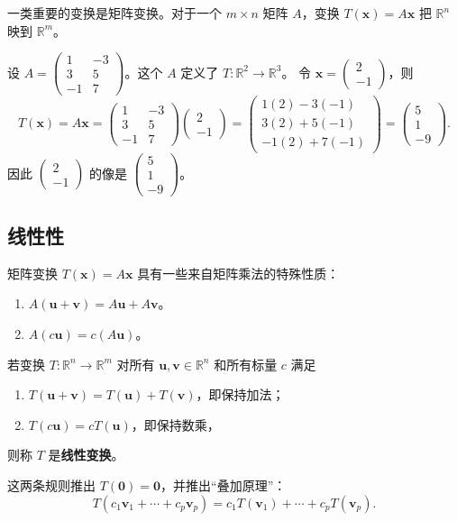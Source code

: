 一类重要的变换是矩阵变换。对于一个 $m\times n$ 矩阵 $A$，变换 $T(\mathbf{x})=A\mathbf{x}$ 把 $\mathbb{R}^n$ 映到 $\mathbb{R}^m$。

\begin{example}
设 $A=\begin{pmatrix}1&-3\\3&5\\-1&7\end{pmatrix}$。这个 $A$ 定义了 $T:\mathbb{R}^2\to\mathbb{R}^3$。
令 $\mathbf{x}=\begin{pmatrix}2\\-1\end{pmatrix}$，则
\[
T(\mathbf{x})=A\mathbf{x}=\begin{pmatrix}1&-3\\3&5\\-1&7\end{pmatrix}\begin{pmatrix}2\\-1\end{pmatrix}
=\begin{pmatrix}1(2)-3(-1)\\3(2)+5(-1)\\-1(2)+7(-1)\end{pmatrix}
=\begin{pmatrix}5\\1\\-9\end{pmatrix}.
\]
因此 $\begin{pmatrix}2\\-1\end{pmatrix}$ 的像是 $\begin{pmatrix}5\\1\\-9\end{pmatrix}$。
\end{example}

\subsection{线性性}
矩阵变换 $T(\mathbf{x})=A\mathbf{x}$ 具有一些来自矩阵乘法的特殊性质：
\begin{enumerate}
    \item $A(\mathbf{u}+\mathbf{v})=A\mathbf{u}+A\mathbf{v}$。
    \item $A(c\mathbf{u})=c(A\mathbf{u})$。
\end{enumerate}

\begin{definition}
若变换 $T:\mathbb{R}^n\to\mathbb{R}^m$ 对所有 $\mathbf{u},\mathbf{v}\in\mathbb{R}^n$ 和所有标量 $c$ 满足
\begin{enumerate}
    \item $T(\mathbf{u}+\mathbf{v})=T(\mathbf{u})+T(\mathbf{v})$，即保持加法；
    \item $T(c\mathbf{u})=cT(\mathbf{u})$，即保持数乘，
\end{enumerate}
则称 $T$ 是\textbf{线性变换}。
\end{definition}
这两条规则推出 $T(\mathbf{0})=\mathbf{0}$，并推出“叠加原理”：
\[
T(c_1\mathbf{v}_1+\cdots+c_p\mathbf{v}_p)=c_1T(\mathbf{v}_1)+\cdots+c_pT(\mathbf{v}_p).
\]

